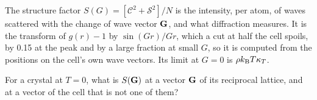 \begin{keyidea}
The structure factor $S(G) = [\mathcal{C}^2 + \mathcal{S}^2]/N$ is the
intensity, per atom, of waves scattered with the change of wave vector
$\bm{\mathrm{G}}$, and what diffraction measures. It is the transform of
$g(r) - 1$ by $\sin(Gr)/Gr$, which a cut at half the cell spoils, by
0.15 at the peak and by a large fraction at small $G$, so it is computed
from the positions on the cell's own wave vectors. Its limit at $G = 0$ is $\rho k_{\mathrm{B}} T\kappa_T$.
\end{keyidea}


\begin{selfcheck}
For a crystal at $T = 0$, what is $S(\bm{\mathrm{G}})$ at a vector $\bm{\mathrm{G}}$ of
its reciprocal lattice, and at a vector of the cell that is not one of
them?
\end{selfcheck}
